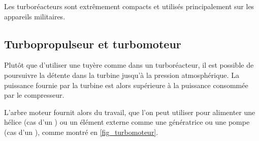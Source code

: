 {{		Les turboréacteurs sont extrêmement compacts et utilisés principalement sur les appareils militaires.

		 

	\subsection{Turbopropulseur et turbomoteur}
	\label{ch_turboprop_turboshaft}

		Plutôt que d’utiliser une tuyère comme dans un turboréacteur, il est possible de poursuivre la détente dans la turbine jusqu’à la pression atmosphérique. La puissance fournie par la turbine est alors supérieure à la puissance consommée par le compresseur. 

		L’arbre moteur fournit alors du travail, que l’on peut utiliser pour alimenter une hélice (cas d’un ) ou un élément externe comme une génératrice ou une pompe (cas d’un ), comme montré en \cref{fig_turbomoteur}.

}}
